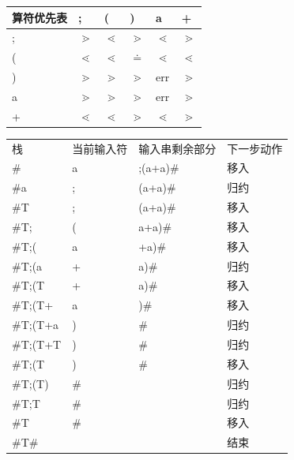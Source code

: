 \documentclass[UTF8]{ctexart} %
\begin{document}
\begin{table}[H]
    \centering
    \begin{tabular}{|p{3cm}<{\centering}|p{1cm}<{\centering}|p{1cm}<{\centering}|p{1cm}<{\centering}|p{1cm}<{\centering}|p{1cm}<{\centering}|}
        \hline
        算符优先表 & ;          & (          & )         & a          & +          \\
        \hline
        ;     & $\gtrdot$  & $\lessdot$ & $\gtrdot$ & $\lessdot$ & $\gtrdot$  \\
        \hline
        (     & $\lessdot$ & $\lessdot$ & $\doteq$  & $\lessdot$ & $\lessdot$ \\
        \hline
        )     & $\gtrdot$  & $\gtrdot$  & $\gtrdot$ & err        & $\gtrdot$  \\
        \hline
        a     & $\gtrdot$  & $\gtrdot$  & $\gtrdot$ & err        & $\gtrdot$  \\
        \hline
        +     & $\lessdot$ & $\lessdot$ & $\gtrdot$ & $\lessdot$ & $\gtrdot$  \\
        \hline
    \end{tabular}
\end{table}

\begin{table}[H]
    \centering
    \begin{tabular}{|p{3cm}<{\centering}|p{2cm}<{\centering}|p{3cm}<{\centering}|p{2cm}<{\centering}|}
        \hline
        栈        & 当前输入符 & 输入串剩余部分  & 下一步动作 \\
        \#       & a     & ;(a+a)\# & 移入    \\
        \#a      & ;     & (a+a)\#  & 归约    \\
        \#T      & ;     & (a+a)\#  & 移入    \\
        \#T;     & (     & a+a)\#   & 移入    \\
        \#T;(    & a     & +a)\#    & 移入    \\
        \#T;(a   & +     & a)\#     & 归约    \\
        \#T;(T   & +     & a)\#     & 移入    \\
        \#T;(T+  & a     & )\#      & 移入    \\
        \#T;(T+a & )     & \#       & 归约    \\
        \#T;(T+T & )     & \#       & 归约    \\
        \#T;(T   & )     & \#       & 移入    \\
        \#T;(T)  & \#    &          & 归约    \\
        \#T;T    & \#    &          & 归约    \\
        \#T      & \#    &          & 移入    \\
        \#T\#    &       &          & 结束    \\
    \end{tabular}
\end{table}
\end{document}

